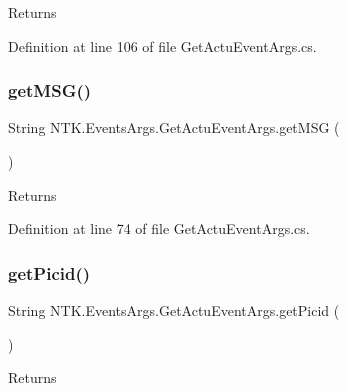 \begin{DoxyReturn}{Returns}

\end{DoxyReturn}


Definition at line 106 of file Get\+Actu\+Event\+Args.\+cs.

\mbox{\label{class_n_t_k_1_1_events_args_1_1_get_actu_event_args_af8ad0b4644a6483a9ea4bbffcfde2859}} 
\subsubsection{\texorpdfstring{getMSG()}{getMSG()}}
{\footnotesize\ttfamily String N\+T\+K.\+Events\+Args.\+Get\+Actu\+Event\+Args.\+get\+M\+SG (\begin{DoxyParamCaption}{ }\end{DoxyParamCaption})}





\begin{DoxyReturn}{Returns}

\end{DoxyReturn}


Definition at line 74 of file Get\+Actu\+Event\+Args.\+cs.

\mbox{\label{class_n_t_k_1_1_events_args_1_1_get_actu_event_args_ab37b8c927d23c37a36f4a8397dd23d70}} 
\subsubsection{\texorpdfstring{getPicid()}{getPicid()}}
{\footnotesize\ttfamily String N\+T\+K.\+Events\+Args.\+Get\+Actu\+Event\+Args.\+get\+Picid (\begin{DoxyParamCaption}{ }\end{DoxyParamCaption})}





\begin{DoxyReturn}{Returns}

\end{DoxyReturn}


